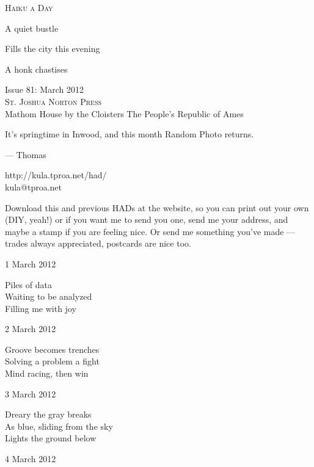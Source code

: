 \documentclass[12pt]{article}
\begin{document}
\begin{center}
{\fontsize{36}{48}\selectfont \textsc{Haiku a Day }}
\end{center}

\vspace*{3.5cm}

{\fontsize{20}{40}\selectfont 

A quiet bustle

Fills the city this evening

A honk chastises

}

\vspace*{5.0cm}
\begin{center}
{\large{Issue 81: March 2012}} \\[5mm]
{\fontsize{8}{8}\selectfont  \textsc{ St. Joshua Norton Press }} \\[1mm]
{\fontsize{6}{6}\selectfont Mathom House by the Cloisters \textbar The People's Republic of Ames }
\end{center}


\newpage

It's springtime in Inwood, and this month Random Photo returns.

--- Thomas

http://kula.tproa.net/had/ \\
kula@tproa.net

Download this and previous HADs at the website, so you can
print out your own (DIY, yeah!) or if you want me to send
you one, send me your address, and maybe a stamp if you
are feeling nice. Or send me something you've made ---
trades always appreciated, postcards are nice too.

\vfill

1 March 2012

Piles of data \\
Waiting to be analyzed \\
Filling me with joy

2 March 2012

Groove becomes trenches \\
Solving a problem a fight \\
Mind racing, then win

3 March 2012

Dreary the gray breaks \\
As blue, sliding from the sky \\
Lights the ground below

\newpage

4 March 2012
\end{document}

